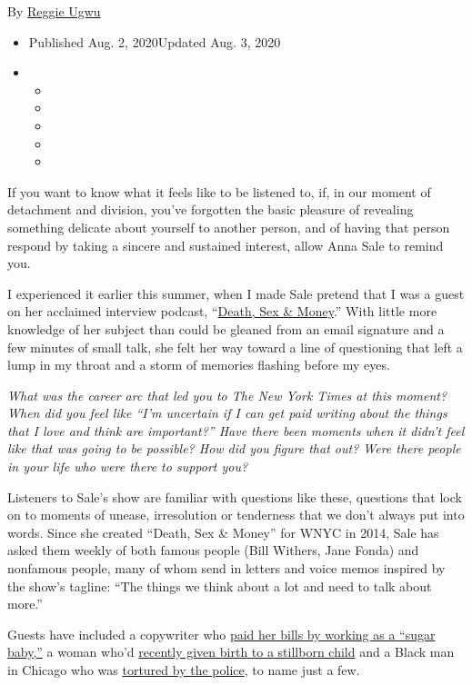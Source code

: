 By \href{https://www.nytimes3xbfgragh.onion/by/reggie-ugwu}{Reggie Ugwu}

\begin{itemize}
\item
  Published Aug. 2, 2020Updated Aug. 3, 2020
\item
  \begin{itemize}
  \item
  \item
  \item
  \item
  \item
  \end{itemize}
\end{itemize}

If you want to know what it feels like to be listened to, if, in our
moment of detachment and division, you've forgotten the basic pleasure
of revealing something delicate about yourself to another person, and of
having that person respond by taking a sincere and sustained interest,
allow Anna Sale to remind you.

I experienced it earlier this summer, when I made Sale pretend that I
was a guest on her acclaimed interview podcast,
``\href{https://www.wnycstudios.org/podcasts/deathsexmoney}{Death, Sex
\& Money}.'' With little more knowledge of her subject than could be
gleaned from an email signature and a few minutes of small talk, she
felt her way toward a line of questioning that left a lump in my throat
and a storm of memories flashing before my eyes.

\emph{What was the career arc that led you to The New York Times at this
moment? When did you feel like ``I'm uncertain if I can get paid writing
about the things that I love and think are important?'' Have there been
moments when it didn't feel like that was going to be possible? How did
you figure that out? Were there people in your life who were there to
support you?}

Listeners to Sale's show are familiar with questions like these,
questions that lock on to moments of unease, irresolution or tenderness
that we don't always put into words. Since she created ``Death, Sex \&
Money'' for WNYC in 2014, Sale has asked them weekly of both famous
people (Bill Withers, Jane Fonda) and nonfamous people, many of whom
send in letters and voice memos inspired by the show's tagline: ``The
things we think about a lot and need to talk about more.''

Guests have included a copywriter who
\href{https://www.wnycstudios.org/podcasts/deathsexmoney/episodes/seeking-arrangement-sugar-daddy-death-sex-money}{paid
her bills by working as a ``sugar baby,''} a woman who'd
\href{https://www.wnycstudios.org/podcasts/deathsexmoney/episodes/stillbirth-death-sex-money}{recently
given birth to a stillborn child} and a Black man in Chicago who was
\href{https://www.wnycstudios.org/podcasts/deathsexmoney/episodes/darrell-cannon-2020-death-sex-money}{tortured
by the police}, to name just a few.

